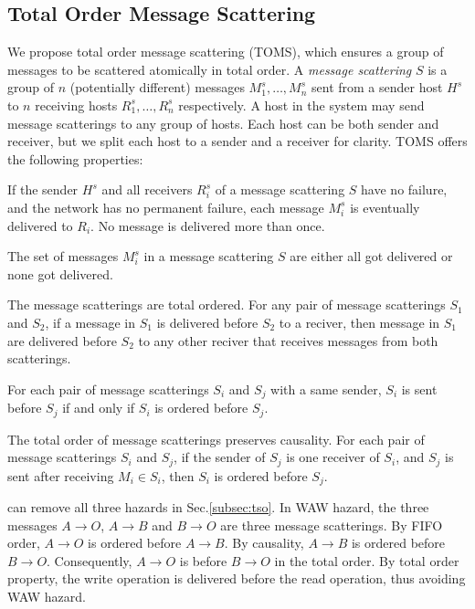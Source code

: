 \subsection{Total Order Message Scattering}

We propose total order message scattering (TOMS), which ensures a group of messages to be scattered atomically in total order.
A \textit{message scattering} $S$ is a group of $n$ (potentially different) messages $M_1^s, \ldots, M_n^s$ sent from a sender host $H^s$ to $n$ receiving hosts $R_1^s, \ldots, R_n^s$ respectively. A host in the system may send message scatterings to any group of hosts.
Each host can be both sender and receiver, but we split each host to a sender and a receiver for clarity.
TOMS offers the following properties:~\cite{kshemkalyani2011distributed}

 If the sender $H^s$ and all receivers $R_i^s$ of a message scattering $S$ have no failure, and the network has no permanent failure, each message $M_i^s$ is eventually delivered to $R_i$. No message is delivered more than once.

 The set of messages $M_i^s$ in a message scattering $S$ are either all got delivered or none got delivered.

The message scatterings are total ordered. For any pair of message scatterings $S_1$ and $S_2$, if a message in $S_1$ is delivered before $S_2$ to a reciver, then message in $S_1$ are delivered before $S_2$ to any other reciver that receives messages from both scatterings. 

For each pair of message scatterings $S_i$ and $S_j$ with a same sender, $S_i$ is sent before $S_j$ if and only if $S_i$ is ordered before $S_j$.

The total order of message scatterings preserves causality. For each pair of message scatterings $S_i$ and $S_j$, if the sender of $S_j$ is one receiver of $S_i$, and $S_j$ is sent after receiving $M_i \in S_i$, then $S_i$ is ordered before $S_j$.

\sys can remove all three hazards in Sec.\ref{subsec:tso}.
In WAW hazard, the three messages $A \rightarrow O$, $A \rightarrow B$ and $B \rightarrow O$ are three message scatterings.
By FIFO order, $A \rightarrow O$ is ordered before $A \rightarrow B$. By causality, $A \rightarrow B$ is ordered before $B \rightarrow O$.
Consequently, $A \rightarrow O$ is before $B \rightarrow O$ in the total order.
By total order property, the write operation is delivered before the read operation, thus avoiding WAW hazard.

